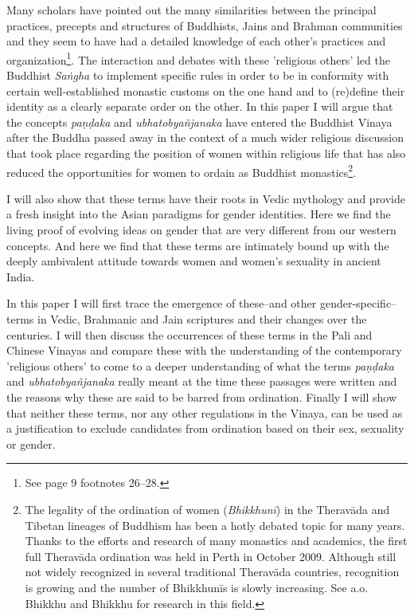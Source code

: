 Many scholars have pointed out the many similarities between the principal practices, precepts and structures of Buddhists, Jains and Brahman communities and they seem to have had a detailed knowledge of each other's practices and organization\footnote{See \cite{maes2016} page 9 footnotes 26–28.}. The interaction and debates with these 'religious others' led the Buddhist {\em Saṅgha} to implement specific rules in order to be in conformity with certain well-established monastic customs on the one hand and to (re)define their identity as a clearly separate order on the other. In this paper I will argue that the concepts {\em paṇḍaka} and {\em ubhatob­yañ­janaka} have entered the Buddhist Vinaya after the Buddha passed away in the context of a much wider religious discussion that took place regarding the position of women within religious life that has also reduced the opportunities for women to ordain as Buddhist monastics\footnote{The legality of the ordination of women ({\em Bhikkhunī}) in the Theravāda and Tibetan lineages of Buddhism has been a hotly debated topic for many years. Thanks to the efforts and research of many monastics and academics, the first full Theravāda ordination was held in Perth in October 2009. Although still not widely recognized in several traditional Theravāda countries, recognition is growing and the number of Bhikkhunīs is slowly increasing. See a.o. Bhikkhu \cite{sujato2009} and Bhikkhu \cite{analayo2013} for research in this field.}. 

I will also show that these terms have their roots in Vedic mythology and provide a fresh insight into the Asian paradigms for gender identities. Here we find the living proof of evolving ideas on gender that are very different from our western concepts. And here we find that these terms are intimately bound up with the deeply ambivalent attitude towards women and women's sexuality in ancient India.

In this paper I will first trace the emergence of these--and other gender-specific--terms in Vedic, Brahmanic and Jain scriptures and their changes over the centuries. I will then discuss the occurrences of these terms in the Pali and Chinese Vinayas and compare these with the understanding of the contemporary 'religious others' to come to a deeper understanding of what the terms {\em paṇḍaka} and {\em ubhatob­yañ­janaka} really meant at the time these passages were written and the reasons why these are said to be barred from ordination. Finally I will show that neither these terms, nor any other regulations in the Vinaya, can be used as a justification to exclude candidates from ordination based on their sex, sexuality or gender.